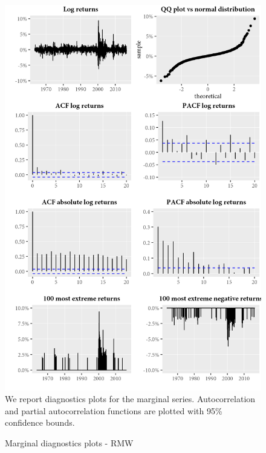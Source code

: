 \begin{figure}[H]
  \caption{Marginal diagnostics plots - RMW}
  \label{diag:marginaldiagRMW}
  \centering
  \begin{minipage}{\textwidth}
  \includegraphics[scale=1]{graphics/marginal/MarginalStats.RMW.Estim.png}  
  \vspace{3mm}
  \footnotesize
  We report diagnostics plots for the marginal series. Autocorrelation and partial autocorrelation functions are plotted with 95\% confidence bounds. 
  \end{minipage}
\end{figure}

